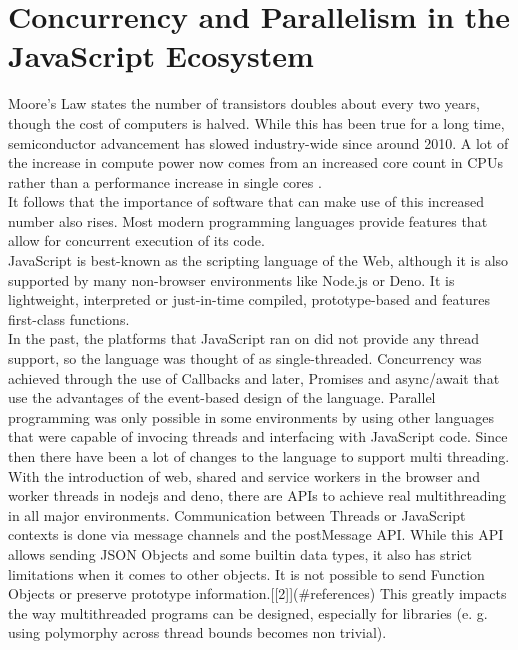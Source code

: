 \clearpage

\label{expose}
\section{Concurrency and Parallelism in the JavaScript Ecosystem}

Moore's Law states the number of transistors doubles about every two years, though the cost of computers is halved. While this has been true for a long time, semiconductor advancement has slowed industry-wide since around 2010.  
A lot of the increase in compute power now comes from an increased core count in CPUs rather than a performance increase in single cores \cite{single-to-multicore}.
 \\
 
It follows that the importance of software that can make use of this increased number also rises.  
Most modern programming languages provide features that allow for concurrent execution of its code.  
 \\
JavaScript is best-known as the scripting language of the Web, although it is also supported by many non-browser environments like Node.js or Deno.
It is lightweight, interpreted or just-in-time compiled, prototype-based and features first-class functions. \\
In the past, the platforms that JavaScript ran on did not provide any thread support, so the language was thought of as single-threaded.  
Concurrency was achieved through the use of Callbacks and later, Promises and async/await that use the advantages of the event-based design of the language.  
Parallel programming was only possible in some environments by using other languages that were capable of invocing threads and interfacing with JavaScript code.   
Since then there have been a lot of changes to the language to support multi threading.  
\\

With the introduction of web, shared and service workers in the browser and worker threads in nodejs and deno, there are APIs to achieve real multithreading in all major environments.
Communication between Threads or JavaScript contexts is done via message channels and the postMessage API. While this API allows sending JSON Objects and some builtin data types, it also has strict limitations when it comes to other objects. It is not possible to send Function Objects or preserve prototype information.[[2]](#references)
This greatly impacts the way multithreaded programs can be designed, especially for libraries (e. g. using polymorphy across thread bounds becomes non trivial).
\\

